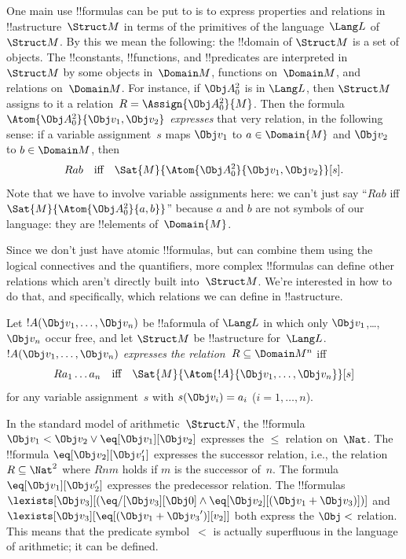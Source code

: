 
\begin{explain}
One main use !!{formula}s can be put to is to express properties and
relations in !!a{structure}~$\Struct M$ in terms of the primitives of
the language~$\Lang L$ of~$\Struct M$.  By this we mean the following:
the !!{domain} of $\Struct M$ is a set of objects.  The !!{constant}s,
!!{function}s, and !!{predicate}s are interpreted in~$\Struct M$ by
some objects in~$\Domain M$, functions on~$\Domain M$, and relations
on~$\Domain M$.  For instance, if $\Obj A^2_0$ is in $\Lang L$, then
$\Struct M$ assigns to it a relation~$R = \Assign{{\Obj
  A^2_0}}{M}$. Then the formula $\Atom{\Obj A^2_0}{\Obj v_1, \Obj v_2}$
\emph{expresses} that very relation, in the following sense: if a
variable assignment~$s$ maps $\Obj v_1$ to $a \in \Domain{M}$ and
$\Obj v_2$ to $b \in \Domain M$, then
\[
Rab \text{\quad iff\quad} \Sat{M}{\Atom{\Obj A^2_0}{\Obj v_1, \Obj v_2}}[s].
\]
Note that we have to involve variable assignments here: we can't just
say ``$Rab$ iff $\Sat{M}{\Atom{\Obj A^2_0}{a, b}}$'' because $a$ and
  $b$ are not symbols of our language: they are !!{element}s
  of~$\Domain{M}$.

Since we don't just have atomic !!{formula}s, but can combine them
using the logical connectives and the quantifiers, more complex
!!{formula}s can define other relations which aren't directly built
into~$\Struct M$.  We're interested in how to do that, and
specifically, which relations we can define in !!a{structure}.
\end{explain}

\begin{defn}
Let $!A(\Obj v_1,\dots, \Obj v_n)$ be !!a{formula} of $\Lang L$ in
which only $\Obj v_1$,\dots, $\Obj v_n$ occur free, and let $\Struct
M$ be !!a{structure} for~$\Lang L$. $!A(\Obj v_1,\dots, \Obj v_n)$
\emph{expresses the relation}~$R \subseteq \Domain M^n$ iff
\[
Ra_1\dots a_n \text{\quad iff\quad} \Sat{M}{\Atom{!A}{\Obj
    v_1,\dots, \Obj v_n}}[s]
\]
for any variable assignment~$s$ with $s(\Obj v_i) = a_i$ ($i = 1,
\dots, n$).
\end{defn}

\begin{ex}
In the standard model of arithmetic~$\Struct N$, the !!{formula} $\Obj
v_1 < \Obj v_2 \lor \eq[\Obj v_1][\Obj v_2]$ expresses the $\le$
relation on~$\Nat$. The !!{formula} $\eq[\Obj v_2][\Obj v_1']$
expresses the successor relation, i.e., the relation $R \subseteq
\Nat^2$ where $Rnm$ holds if $m$ is the successor of~$n$. The formula
$\eq[\Obj v_1][\Obj v_2']$ expresses the predecessor relation.  The
!!{formula}s $\lexists[\Obj v_3][(\eq/[\Obj v_3][\Obj 0] \land
  \eq[\Obj v_2][(\Obj v_1 + \Obj v_3)])]$ and $\lexists[\Obj
  v_3][\eq[(\Obj v_1 + {\Obj v_3}')][v_2]]$ both express the $\Obj <$
relation.  This means that the predicate symbol~$<$ is actually
superfluous in the language of arithmetic; it can be defined.
\end{ex}

